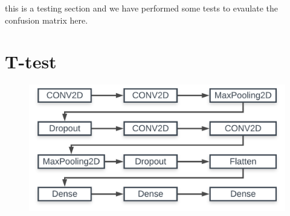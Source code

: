 this is a testing section and we have performed some tests to evaulate the confusion matrix here.
\section{T-test}
\begin{figure}[!htp]
\centering
\includegraphics[width=\textwidth]{Images/model.png}
\end{figure}
